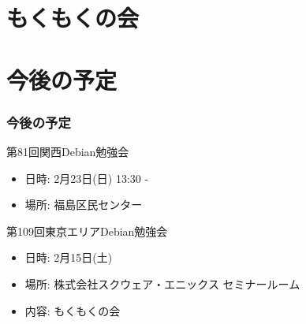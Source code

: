\documentclass[cjk,dvipdfmx,10pt,compress,%
hyperref={bookmarks=true,bookmarksnumbered=true,bookmarksopen=false,%
colorlinks=false,%
pdftitle={第 80 回 関西 Debian 勉強会},%
pdfauthor={倉敷・のがた・佐々木・かわだ・八津尾},%
pdfsubject={資料},%
}]{beamer}
\begin{document}

\section{もくもくの会}


\section{今後の予定}
\begin{frame}[fragile]
\frametitle{今後の予定}

\begin{block}{第81回関西Debian勉強会}
  \begin{itemize}
  \item 日時: 2月23日(日) 13:30 -
  \item 場所: 福島区民センター
  \end{itemize}
\end{block}

\begin{block}{第109回東京エリアDebian勉強会}
  \begin{itemize}
  \item 日時: 2月15日(土)
  \item 場所: 株式会社スクウェア・エニックス セミナールーム
  \item 内容: もくもくの会
  \end{itemize}
\end{block}

\end{frame}

\takahashi[50]{  }
\end{document}
